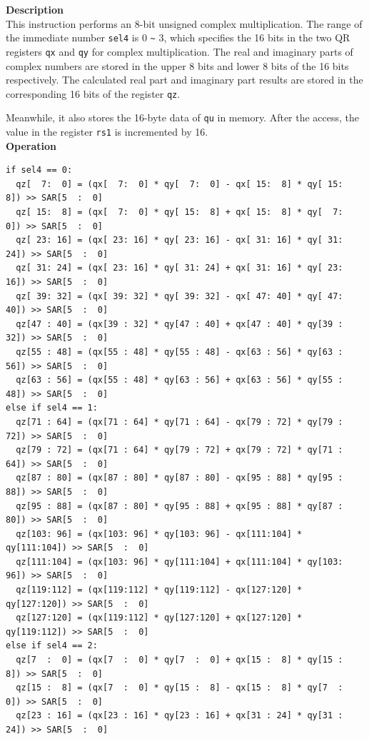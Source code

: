 \textbf{Description}\\
This instruction performs an 8-bit unsigned complex multiplication. The range of the immediate number \lstinline{sel4} is 0 \verb+~+ 3, which specifies the 16 bits in the two QR registers \lstinline{qx} and \lstinline{qy} for complex multiplication. The real and imaginary parts of complex numbers are stored in the upper 8 bits and lower 8 bits of the 16 bits respectively. The calculated real part and imaginary part results are stored in the corresponding 16 bits of the register \lstinline{qz}.

Meanwhile, it also stores the 16-byte data of \lstinline{qu} in memory. After the access, the value in the register \lstinline{rs1} is incremented by 16.\\
\textbf{Operation}\\
\begin{lstlisting}
if sel4 == 0:
  qz[  7:  0] = (qx[  7:  0] * qy[  7:  0] - qx[ 15:  8] * qy[ 15:  8]) >> SAR[5  :  0]
  qz[ 15:  8] = (qx[  7:  0] * qy[ 15:  8] + qx[ 15:  8] * qy[  7:  0]) >> SAR[5  :  0]
  qz[ 23: 16] = (qx[ 23: 16] * qy[ 23: 16] - qx[ 31: 16] * qy[ 31: 24]) >> SAR[5  :  0]
  qz[ 31: 24] = (qx[ 23: 16] * qy[ 31: 24] + qx[ 31: 16] * qy[ 23: 16]) >> SAR[5  :  0]
  qz[ 39: 32] = (qx[ 39: 32] * qy[ 39: 32] - qx[ 47: 40] * qy[ 47: 40]) >> SAR[5  :  0]
  qz[47 : 40] = (qx[39 : 32] * qy[47 : 40] + qx[47 : 40] * qy[39 : 32]) >> SAR[5  :  0]
  qz[55 : 48] = (qx[55 : 48] * qy[55 : 48] - qx[63 : 56] * qy[63 : 56]) >> SAR[5  :  0]
  qz[63 : 56] = (qx[55 : 48] * qy[63 : 56] + qx[63 : 56] * qy[55 : 48]) >> SAR[5  :  0]
else if sel4 == 1:
  qz[71 : 64] = (qx[71 : 64] * qy[71 : 64] - qx[79 : 72] * qy[79 : 72]) >> SAR[5  :  0]
  qz[79 : 72] = (qx[71 : 64] * qy[79 : 72] + qx[79 : 72] * qy[71 : 64]) >> SAR[5  :  0]
  qz[87 : 80] = (qx[87 : 80] * qy[87 : 80] - qx[95 : 88] * qy[95 : 88]) >> SAR[5  :  0]
  qz[95 : 88] = (qx[87 : 80] * qy[95 : 88] + qx[95 : 88] * qy[87 : 80]) >> SAR[5  :  0]
  qz[103: 96] = (qx[103: 96] * qy[103: 96] - qx[111:104] * qy[111:104]) >> SAR[5  :  0]
  qz[111:104] = (qx[103: 96] * qy[111:104] + qx[111:104] * qy[103: 96]) >> SAR[5  :  0]
  qz[119:112] = (qx[119:112] * qy[119:112] - qx[127:120] * qy[127:120]) >> SAR[5  :  0]
  qz[127:120] = (qx[119:112] * qy[127:120] + qx[127:120] * qy[119:112]) >> SAR[5  :  0]
else if sel4 == 2:
  qz[7  :  0] = (qx[7  :  0] * qy[7  :  0] + qx[15 :  8] * qy[15 :  8]) >> SAR[5  :  0]
  qz[15 :  8] = (qx[7  :  0] * qy[15 :  8] - qx[15 :  8] * qy[7  :  0]) >> SAR[5  :  0]
  qz[23 : 16] = (qx[23 : 16] * qy[23 : 16] + qx[31 : 24] * qy[31 : 24]) >> SAR[5  :  0]

\end{lstlisting}
